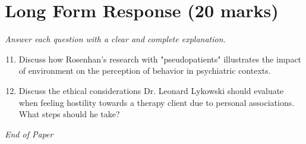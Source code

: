 \documentclass[12pt]{article}
\begin{document}
\section*{Long Form Response (20 marks)}
\textit{Answer each question with a clear and complete explanation.}
\begin{enumerate}[label=\arabic*.]
\setcounter{enumi}{10}
\item Discuss how Rosenhan's research with "pseudopatients" illustrates the impact of environment on the perception of behavior in psychiatric contexts.
\item Discuss the ethical considerations Dr. Leonard Lykowski should evaluate when feeling hostility towards a therapy client due to personal associations. What steps should he take?
\end{enumerate}

\vfill
\noindent\textit{End of Paper}
\end{document}
